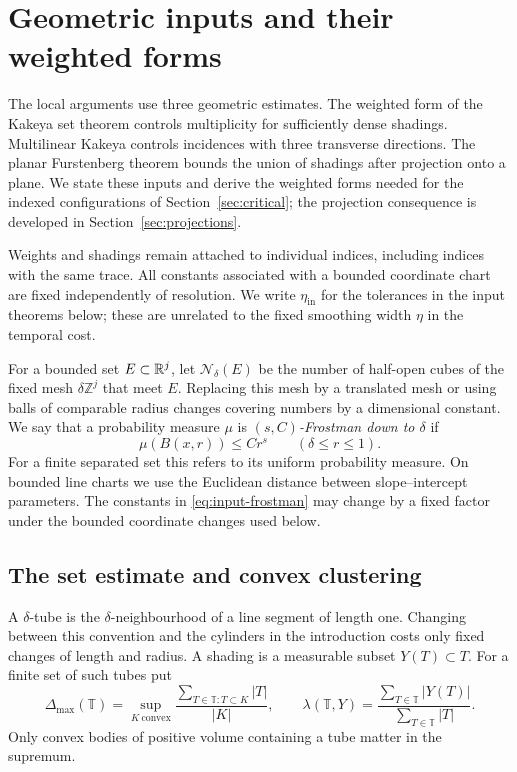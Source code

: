 \section{Geometric inputs and their weighted forms}\label{sec:inputs}

The local arguments use three geometric estimates. The weighted form of
the Kakeya set theorem controls multiplicity for sufficiently dense
shadings. Multilinear Kakeya controls incidences with three transverse
directions. The planar Furstenberg theorem bounds the union of shadings
after projection onto a plane. We state these inputs and derive
the weighted forms needed for the indexed configurations of
Section~\ref{sec:critical}; the projection consequence is developed in
Section~\ref{sec:projections}.

Weights and shadings remain attached to individual indices, including
indices with the same trace. All constants associated with a bounded
coordinate chart are fixed independently of resolution. We write
$\eta_{\mathrm{in}}$ for the tolerances in the input theorems below;
these are unrelated to the fixed smoothing width $\eta$ in the temporal
cost.

For a bounded set $E\subset\mathbb R^j$, let $\mathcal N_\delta(E)$ be the
number of half-open cubes of the fixed mesh $\delta\mathbb Z^j$ that meet
$E$. Replacing this mesh by a translated mesh or using balls of
comparable radius changes covering numbers by a dimensional constant.
We say that a probability measure $\mu$ is
\emph{$(s,C)$-Frostman down to $\delta$} if
\begin{equation}\label{eq:input-frostman}
 \mu(B(x,r))\le Cr^s\qquad(\delta\le r\le1).
\end{equation}
For a finite separated set this refers to its uniform probability
measure. On bounded line charts we use the Euclidean distance between
slope--intercept parameters. The constants in
\eqref{eq:input-frostman} may change by a fixed factor under the bounded
coordinate changes used below.

\subsection{The set estimate and convex clustering}

A $\delta$-tube is the $\delta$-neighbourhood of a line segment of
length one. Changing between this convention and the cylinders in the
introduction costs only fixed changes of length and radius.
A shading is a measurable subset $Y(T)\subset T$.
For a finite set of such tubes put
\[
 \Delta_{\max}(\mathbb T)
 =\sup_{K\ \mathrm{convex}}
   \frac{\sum_{T\in\mathbb T:T\subset K}|T|}{|K|},
 \qquad
 \lambda(\mathbb T,Y)
 =\frac{\sum_{T\in\mathbb T}|Y(T)|}
        {\sum_{T\in\mathbb T}|T|}.
\]
Only convex bodies of positive volume containing a tube matter in
the supremum.

